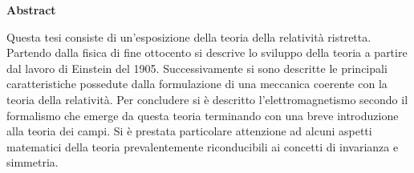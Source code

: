 \vspace*{10pt}
\begin{center}
	\large\textbf{Abstract}\normalsize
\end{center}
\vspace*{10pt}
\begin{changemargin}{1cm}{1cm}
Questa tesi consiste di un'esposizione della teoria della relatività ristretta. Partendo dalla fisica di fine ottocento si descrive lo sviluppo della teoria a partire dal lavoro di Einstein del 1905.  Successivamente si sono descritte le principali caratteristiche possedute dalla formulazione di una meccanica coerente con la teoria della relatività. Per concludere si è descritto l'elettromagnetismo secondo il formalismo che emerge da questa teoria terminando con una breve introduzione alla teoria dei campi.
Si è prestata particolare attenzione ad alcuni aspetti matematici della teoria prevalentemente riconducibili ai concetti di invarianza e simmetria.
\end{changemargin}